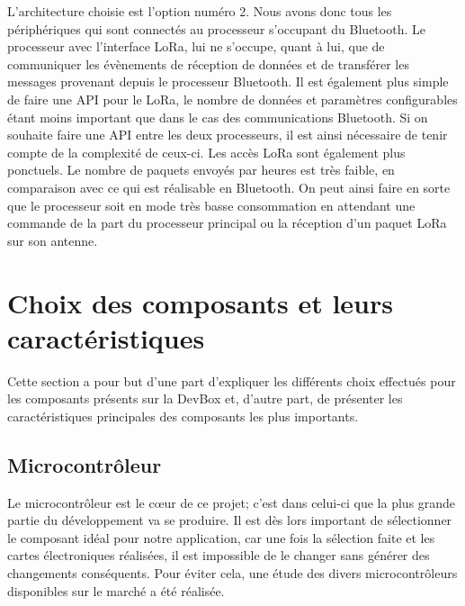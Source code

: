L'architecture choisie est l'option numéro 2. Nous avons donc tous les périphériques qui sont connectés au processeur s'occupant du Bluetooth. Le processeur avec l'interface LoRa, lui ne s'occupe, quant à lui, que de communiquer les évènements de réception de données et de transférer les messages provenant depuis le processeur Bluetooth. Il est également plus simple de faire une API pour le LoRa, le nombre de données et paramètres configurables étant moins important que dans le cas des communications Bluetooth. Si on souhaite faire une API entre les deux processeurs, il est ainsi nécessaire de tenir compte de la complexité de ceux-ci. Les accès LoRa sont également plus ponctuels. Le nombre de paquets envoyés par heures est très faible, en comparaison avec ce qui est réalisable en Bluetooth. On peut ainsi faire en sorte que le processeur soit en mode très basse consommation en attendant une commande de la part du processeur principal ou la réception d'un paquet LoRa sur son antenne.


\section{Choix des composants et leurs caractéristiques}

Cette section a pour but d'une part d'expliquer les différents choix effectués pour les composants présents sur la DevBox et, d'autre part, de présenter les caractéristiques principales des composants les plus importants.

\subsection{Microcontrôleur}
\label{subsect:microcontroleur}

Le microcontrôleur est le c\oe ur de ce projet; c'est dans celui-ci que la plus grande partie du développement va se produire. Il est dès lors important de sélectionner le composant idéal pour notre application, car une fois la sélection faite et les cartes électroniques réalisées, il est impossible de le changer sans générer des changements conséquents. Pour éviter cela, une étude des divers microcontrôleurs disponibles sur le marché a été réalisée.

